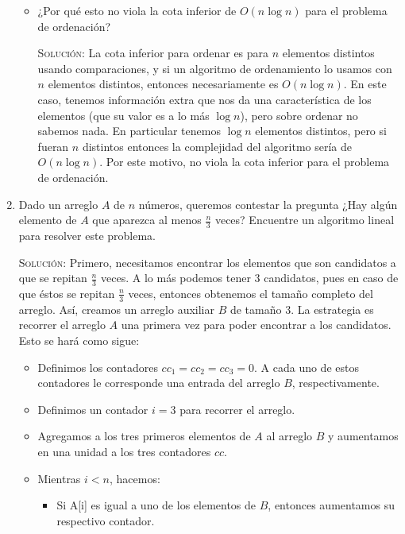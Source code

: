 \documentclass[letterpaper,11pt]{article}
\begin{document}
\begin{enumerate}
\begin{itemize}
        \item ¿Por qué esto no viola la cota inferior de $O(n \log n)$ para el 
        problema de ordenación?

        \textsc{Solución:} La cota inferior para ordenar es para $n$ elementos 
        distintos usando comparaciones, y si un algoritmo de ordenamiento lo 
        usamos con $n$ elementos distintos, entonces necesariamente es 
        $O(n \log n)$. En este caso, tenemos información extra que nos da una 
        característica de los elementos (que su valor es a lo más $\log n$), 
        pero sobre ordenar no sabemos nada. En particular tenemos $\log n$
        elementos distintos, pero si fueran $n$ distintos entonces la 
        complejidad del algoritmo sería de $O(n \log n)$. Por este motivo,
        no viola la cota inferior para el problema de ordenación.
    \end{itemize}
    
    \item Dado un arreglo $A$ de $n$ números, queremos contestar la pregunta 
    ¿Hay algún elemento de $A$ que aparezca al menos $\frac{n}{3}$ veces? 
    Encuentre un algoritmo lineal para resolver este problema.

    \textsc{Solución:} Primero, necesitamos encontrar los elementos que son  
    candidatos a que se repitan $\frac{n}{3}$ veces. A lo más podemos tener 
    $3$ candidatos, pues en caso de que éstos se repitan $\frac{n}{3}$ veces, 
    entonces obtenemos el tamaño completo del arreglo. Así, creamos un arreglo 
    auxiliar $B$ de tamaño $3$. La estrategia es recorrer el arreglo $A$ una 
    primera vez para poder encontrar a los candidatos. Esto se hará como
    sigue:
    \begin{itemize}
        \item Definimos los contadores $cc_1 = cc_2 = cc_3 = 0$. A cada uno 
        de estos contadores le corresponde una entrada del arreglo $B$,
        respectivamente.

        \item Definimos un contador $i = 3$ para recorrer el arreglo.

        \item Agregamos a los tres primeros elementos de $A$ al arreglo $B$ y 
        aumentamos en una unidad a los tres contadores $cc$.
        
        \item Mientras $i < n$, hacemos:
        \begin{itemize}
            \item Si A[i] es igual a uno de los elementos de $B$, entonces 
            aumentamos su respectivo contador.


\end{itemize}
\end{itemize}
\end{enumerate}
\end{document}
